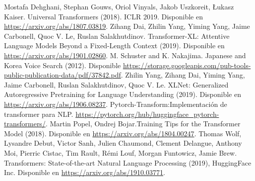 \documentclass[conference]{IEEEtran}
\begin{document}
\begin{thebibliography}{00}
Mostafa Dehghani, Stephan Gouws, Oriol Vinyals, Jakob Uszkoreit, Łukasz Kaiser. Universal Transformers (2018). ICLR 2019. Disponible en \href{https://arxiv.org/abs/1807.03819}{https://arxiv.org/abs/1807.03819}.
Zihang Dai, Zhilin Yang, Yiming Yang, Jaime Carbonell, Quoc V. Le, Ruslan Salakhutdinov. Transformer-XL: Attentive Language Models Beyond a Fixed-Length Context (2019). Disponible en \href{https://arxiv.org/abs/1901.02860}{https://arxiv.org/abs/1901.02860}. 
M. Schuster and K. Nakajima. Japanese and Korea Voice Search (2012). Disponible \href{https://storage.googleapis.com/pub-tools-public-publication-data/pdf/37842.pdf}{https://storage.googleapis.com/pub-tools-public-publication-data/pdf/37842.pdf}.
Zhilin Yang, Zihang Dai, Yiming Yang, Jaime Carbonell, Ruslan Salakhutdinov, Quoc V. Le. XLNet: Generalized Autoregressive Pretraining for Language Understanding (2019). Disponible en \href{https://arxiv.org/abs/1906.08237}{https://arxiv.org/abs/1906.08237}.
Pytorch-Transform:Implementaci\'on de transformer para NLP. \href{https://pytorch.org/hub/huggingface\_pytorch-transformers/}{https://pytorch.org/hub/huggingface\_pytorch-transformers/}.
Martin Popel, Ondrej Bojar.Training Tips for the Transformer Model (2018). Disponible en \href{https://arxiv.org/abs/1804.00247}{https://arxiv.org/abs/1804.00247}.
Thomas Wolf, Lysandre Debut, Victor Sanh, Julien Chaumond,
Clement Delangue, Anthony Moi, Pierric Cistac, Tim Rault,
 R\'emi Louf, Morgan Funtowicz, Jamie Brew. Transformers: State-of-the-art Natural
Language Processing (2019), HuggingFace Inc. Disponible en \href{https://arxiv.org/abs/1910.03771}{https://arxiv.org/abs/1910.03771}.
\end{thebibliography}
\end{document}
